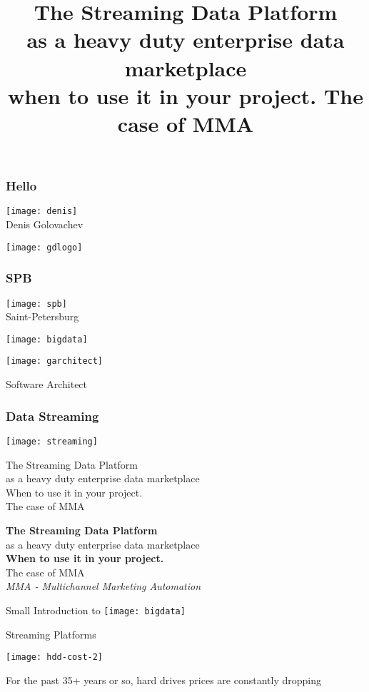 \documentclass[aspectratio=169, 15pt,usenames,dvipsnames]{beamer}
\title{The Streaming Data Platform\\\small as a heavy duty enterprise data marketplace\\\tiny when to use it in your project. The case of MMA}
\begin{document}
  
\begin{titlePage} 
	\titlepage        
\end{titlePage}
	
\begin{gdsw}
	\frametitle{Hello}
	\centering\texttt{[image: denis]}
	\\Denis Golovachev		
\end{gdsw} 
\begin{gdsw}
	\centering\texttt{[image: gdlogo]}
\end{gdsw}
\begin{gdsw}
	\frametitle{SPB}
	\centering\texttt{[image: spb]}
	\\Saint-Petersburg
\end{gdsw}
\begin{gdsw}
	\centering\texttt{[image: bigdata]} 
\end{gdsw}
\begin{gdsw}
	\centering\texttt{[image: garchitect]} 
	\par\LARGE
	Software Architect
\end{gdsw}
\begin{gdsw}
	\frametitle{Data Streaming}
	\centering\texttt{[image: streaming]} 
\end{gdsw}
\begin{gdsw}
	\centering\LARGE
	The Streaming Data Platform\\
	as a heavy duty enterprise data marketplace\\
	When to use it in your project.\\
	The case of MMA
\end{gdsw}
\begin{gdsw}
	\centering\LARGE
	{\bf The Streaming Data Platform}\\
	as a heavy duty enterprise data marketplace\\
	{\bf When to use it in your project.}\\
	The case of MMA
	\pause\\
	{\it\small MMA - Multichannel Marketing Automation}
\end{gdsw}
\begin{gdsw}
	\LARGE\centering Small Introduction to
	\centering\texttt{[image: bigdata]}
	\par
	Streaming Platforms
\end{gdsw}
\begin{gdsw}
	\centering\texttt{[image: hdd-cost-2]} 
	\par	
	For the past 35+ years or so, hard drives prices are constantly dropping
\end{gdsw}
\end{document}

